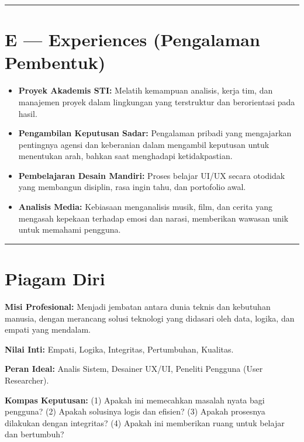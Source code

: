 \documentclass[
  letterpaper,
  DIV=11,
  numbers=noendperiod]{scrreprt}
\providecommand{\tightlist}{%
  \setlength{\itemsep}{0pt}\setlength{\parskip}{0pt}}
\begin{document}
\begin{center}\rule{0.5\linewidth}{0.5pt}\end{center}

\section{E --- Experiences (Pengalaman
Pembentuk)}\label{e-experiences-pengalaman-pembentuk}

\begin{itemize}
\tightlist
\item
  \textbf{Proyek Akademis STI:} Melatih kemampuan analisis, kerja tim,
  dan manajemen proyek dalam lingkungan yang terstruktur dan
  berorientasi pada hasil.
\item
  \textbf{Pengambilan Keputusan Sadar:} Pengalaman pribadi yang
  mengajarkan pentingnya agensi dan keberanian dalam mengambil keputusan
  untuk menentukan arah, bahkan saat menghadapi ketidakpastian.
\item
  \textbf{Pembelajaran Desain Mandiri:} Proses belajar UI/UX secara
  otodidak yang membangun disiplin, rasa ingin tahu, dan portofolio
  awal.
\item
  \textbf{Analisis Media:} Kebiasaan menganalisis musik, film, dan
  cerita yang mengasah kepekaan terhadap emosi dan narasi, memberikan
  wawasan unik untuk memahami pengguna.
\end{itemize}

\begin{center}\rule{0.5\linewidth}{0.5pt}\end{center}

\section{Piagam Diri}\label{piagam-diri}

\textbf{Misi Profesional:} Menjadi jembatan antara dunia teknis dan
kebutuhan manusia, dengan merancang solusi teknologi yang didasari oleh
data, logika, dan empati yang mendalam.

\textbf{Nilai Inti:} Empati, Logika, Integritas, Pertumbuhan, Kualitas.

\textbf{Peran Ideal:} Analis Sistem, Desainer UX/UI, Peneliti Pengguna
(User Researcher).

\textbf{Kompas Keputusan:} (1) Apakah ini memecahkan masalah nyata bagi
pengguna? (2) Apakah solusinya logis dan efisien? (3) Apakah prosesnya
dilakukan dengan integritas? (4) Apakah ini memberikan ruang untuk
belajar dan bertumbuh?
\end{document}
